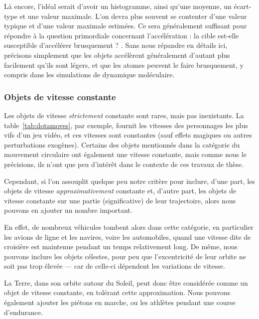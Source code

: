 	Là encore, l'idéal serait d'avoir un histogramme, ainsi qu'une moyenne, un écart-type et une valeur maximale. L'on devra plus souvent se contenter d'une valeur typique et d'une valeur maximale estimées. Ce sera généralement suffisant pour répondre à la question primordiale concernant l'accélération : \og la cible est-elle susceptible d'accélérer brusquement ? \fg{}. Sans nous répandre en détails ici, précisons simplement que les objets accélèrent généralement d'autant plus facilement qu'ils sont légers, et que les atomes peuvent le faire brusquement, y compris dans les simulations de dynamique moléculaire.

	
	\FloatBarrier \subsubsection{Objets de vitesse constante}
	Les objets de vitesse \emph{strictement} constante sont rares, mais pas inexistants. La table~\ref{tab:dotamoves}, par exemple, fournit les vitesses des personnages les plus vifs d'un jeu vidéo, et ces vitesses sont constantes (sauf effets magiques ou autres perturbations exogènes). Certains des objets mentionnés dans la catégorie du mouvement circulaire ont également une vitesse constante, mais comme nous le précisions, ils n'ont que peu d'intérêt dans le contexte de ces travaux de thèse.
	
	Cependant, si l'on assouplit quelque peu notre critère pour inclure, d'une part, les objets de vitesse \emph{approximativement} constante et, d'autre part, les objets de vitesse constante sur une partie (significative) de leur trajectoire, alors nous pouvons en ajouter un nombre important.
	
	En effet, de nombreux véhicules tombent alors dans cette catégorie, en particulier les avions de ligne et les navires, voire les automobiles, quand une vitesse dite de croisière est maintenue pendant un temps relativement long. De même, nous pouvons inclure les objets célestes, pour peu que l'excentricité de leur orbite ne soit pas trop élevée --- car de celle-ci dépendent les variations de vitesse.
	
	La Terre, dans son orbite autour du Soleil, peut donc être considérée comme un objet de vitesse constante, en tolérant cette approximation. Nous pouvons également ajouter les piétons en marche, ou les athlètes pendant une course d'endurance.
	
